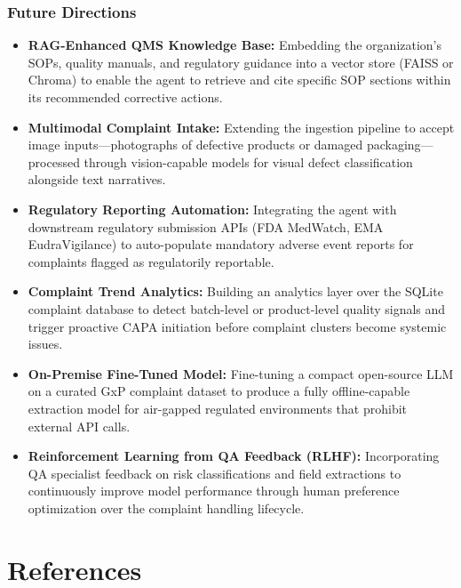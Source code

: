 \documentclass[12pt,a4paper]{report}
\begin{document}
\subsection{Future Directions}

\begin{itemize}[leftmargin=*]
\item \textbf{RAG-Enhanced QMS Knowledge Base:} Embedding the organization's SOPs, quality manuals, and regulatory guidance into a vector store (FAISS or Chroma) to enable the agent to retrieve and cite specific SOP sections within its recommended corrective actions.

\item \textbf{Multimodal Complaint Intake:} Extending the ingestion pipeline to accept image inputs---photographs of defective products or damaged packaging---processed through vision-capable models for visual defect classification alongside text narratives.

\item \textbf{Regulatory Reporting Automation:} Integrating the agent with downstream regulatory submission APIs (FDA MedWatch, EMA EudraVigilance) to auto-populate mandatory adverse event reports for complaints flagged as regulatorily reportable.

\item \textbf{Complaint Trend Analytics:} Building an analytics layer over the SQLite complaint database to detect batch-level or product-level quality signals and trigger proactive CAPA initiation before complaint clusters become systemic issues.

\item \textbf{On-Premise Fine-Tuned Model:} Fine-tuning a compact open-source LLM on a curated GxP complaint dataset to produce a fully offline-capable extraction model for air-gapped regulated environments that prohibit external API calls.

\item \textbf{Reinforcement Learning from QA Feedback (RLHF):} Incorporating QA specialist feedback on risk classifications and field extractions to continuously improve model performance through human preference optimization over the complaint handling lifecycle.
\end{itemize}

\chapter*{References}
\end{document}
